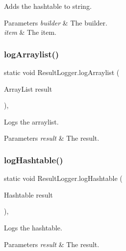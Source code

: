 Adds the hashtable to string. 


\begin{DoxyParams}{Parameters}
{\em builder} & The builder.\\
\hline
{\em item} & The item.\\
\hline
\end{DoxyParams}
\mbox{\label{class_result_logger_ac15653ab60b55f041711fcb2cbeeee42}} 
\subsubsection{\texorpdfstring{log\+Arraylist()}{logArraylist()}}
{\footnotesize\ttfamily static void Result\+Logger.\+log\+Arraylist (\begin{DoxyParamCaption}\item[{Array\+List}]{result }\end{DoxyParamCaption})\hspace{0.3cm}{\ttfamily [inline]}, {\ttfamily [static]}}



Logs the arraylist. 


\begin{DoxyParams}{Parameters}
{\em result} & The result.\\
\hline
\end{DoxyParams}
\mbox{\label{class_result_logger_af61803afb3b2bc905bd3e5643b2d893b}} 
\subsubsection{\texorpdfstring{log\+Hashtable()}{logHashtable()}}
{\footnotesize\ttfamily static void Result\+Logger.\+log\+Hashtable (\begin{DoxyParamCaption}\item[{Hashtable}]{result }\end{DoxyParamCaption})\hspace{0.3cm}{\ttfamily [inline]}, {\ttfamily [static]}}



Logs the hashtable. 


\begin{DoxyParams}{Parameters}
{\em result} & The result.\\
\hline
\end{DoxyParams}
\mbox{\label{class_result_logger_af419bde152200fa5abcdde26ea10c7d8}} 
